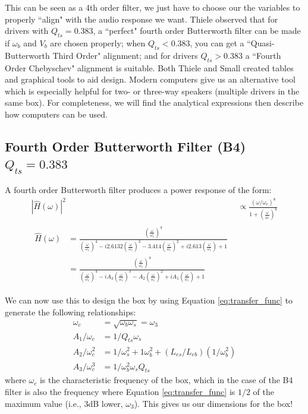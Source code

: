 \documentclass[10pt]{book}
\begin{document}

This can be seen as a 4th order filter, we just have to choose our the variables to properly ``align" with the audio response we want. Thiele observed that for drivers with $Q_{ts}=0.383$, a ``perfect" fourth order Butterworth filter can be made if $\omega_b$ and $V_b$ are chosen properly; when $Q_{ts}<0.383$, you can get a ``Quasi-Butterworth Third Order" alignment; and for drivers $Q_{ts}>0.383$ a ``Fourth Order Chebyschev" alignment is suitable. Both Thiele and Small created tables and graphical tools to aid design. Modern computers give us an alternative tool which is especially helpful for two- or three-way speakers (multiple drivers in the same box). For completeness, we will find the analytical expressions then describe how computers can be used.

\subsection{Fourth Order Butterworth Filter (B4) \texorpdfstring{\\$Q_{ts}=0.383$}{Qts=0.383}} A fourth order Butterworth filter produces a power response of the form:
\begin{align}
\left|  \hat{H}(\omega) \right|^2&\propto \frac{(\omega/\omega_c)^8}{1+\left(\frac{\omega}{\omega_c}\right)^8}\label{eq:transfer_func}\\
\begin{split}
\hat{H}(\omega)&=\frac{(\frac{\omega}{\omega_c})^4}{(\frac{\omega}{\omega_c})^4-i2.6132(\frac{\omega}{\omega_c})^3-3.414(\frac{\omega}{\omega_c})^2+i2.613(\frac{\omega}{\omega_c})+1}\\
&=\frac{(\frac{\omega}{\omega_c})^4}{(\frac{\omega}{\omega_c})^4-iA_3(\frac{\omega}{\omega_c})^3-A_2(\frac{\omega}{\omega_c})^2+iA_1(\frac{\omega}{\omega_c})+1}
\end{split}
\end{align}

We can now use this to design the box by using Equation \ref{eq:transfer_func} to generate the following relationships:
\begin{align}
\omega_c&=\sqrt{\omega_b \omega_s}=\omega_3\\
A_1/\omega_c&=1/Q_{ts}\omega_s\\
A_2/\omega_c^2&=1/\omega_s^2+1\omega_b^2+(L_{es}/L_{eb})(1/\omega_b^2)\\
A_3/\omega_c^3&=1/\omega_b^2\omega_sQ_{ts}
\end{align}
where $\omega_c$ is the characteristic frequency of the box, which in the case of the B4 filter is also the frequency where Equation \ref{eq:transfer_func} is $1/2$ of the maximum value (i.e., 3dB lower, $\omega_3$). This gives us our dimensions for the box!
\end{document}
